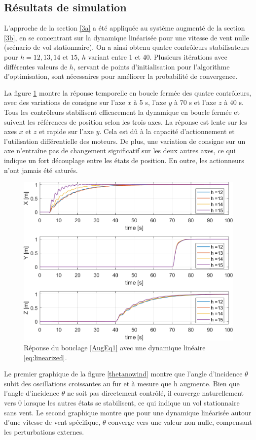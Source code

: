 \subsection{Résultats de simulation}

L'approche de la section \ref{3a} a été appliquée au système augmenté de la section \ref{3b}, en se concentrant sur la dynamique linéarisée pour une vitesse de vent nulle (scénario de vol stationnaire). On a ainsi obtenu quatre contrôleurs stabilisateurs pour $h=12, 13, 14 \text{ et } 15$, $h$ variant entre 1 et 40. Plusieurs itérations avec différentes valeurs de $h$, servant de points d'initialisation pour l'algorithme d'optimisation, sont nécessaires pour améliorer la probabilité de convergence.

La figure \ref{HKStepRes_a} montre la réponse temporelle en boucle fermée des quatre contrôleurs, avec des variations de consigne sur l'axe $x$ à 5 s, l'axe $y$ à 70 s et l'axe $z$ à 40 s. Tous les contrôleurs stabilisent efficacement la dynamique en boucle fermée et suivent les références de position selon les trois axes. La réponse est lente sur les axes $x$ et $z$ et rapide sur l'axe $y$. Cela est dû à la capacité d'actionnement et l'utilisation différentielle des moteurs. De plus, une variation de consigne sur un axe n'entraîne pas de changement significatif sur les deux autres axes, ce qui indique un fort découplage entre les états de position. En outre, les actionneurs n'ont jamais été saturés.


\begin{figure}[hbt]
    \centering
   \includegraphics[width=0.7\columnwidth]{figures/stepResponse.png}
    \caption{Réponse du bouclage \eqref{AugEq1} avec une dynamique linéaire \eqref{eq:linearized}.}
    \label{HKStepRes_a}
\end{figure}

Le premier graphique de la figure \ref{thetanowind} montre que l'angle d'incidence $\theta$ subit des oscillations croissantes au fur et à mesure que h augmente. Bien que l'angle d'incidence $\theta$ ne soit pas directement contrôlé, il converge naturellement vers 0 lorsque les autres états se stabilisent, ce qui indique un vol stationnaire sans vent. Le second graphique montre que pour une dynamique linéarisée autour d'une vitesse de vent spécifique, $\theta$ converge vers une valeur non nulle, compensant les perturbations externes.

